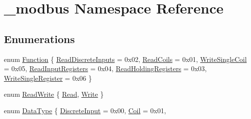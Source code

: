 \hypertarget{namespace__modbus}{}\section{\+\_\+modbus Namespace Reference}
\label{namespace__modbus}
\subsection*{Enumerations}
\begin{DoxyCompactItemize}
\item 
enum \hyperlink{namespace__modbus_a405e676860ce36c153997102aba73d65}{Function} \{ \newline
\hyperlink{namespace__modbus_a405e676860ce36c153997102aba73d65a1c874247bd0604e12687bc9e9b9c9234}{Read\+Discrete\+Inputs} = 0x02, 
\newline
\hyperlink{namespace__modbus_a405e676860ce36c153997102aba73d65a41faa3d82dbd85bf85bbf86c5e4c3bbe}{Read\+Coils} = 0x01, 
\newline
\hyperlink{namespace__modbus_a405e676860ce36c153997102aba73d65abf6b0c548ca227992f07a8b7f75a3ab7}{Write\+Single\+Coil} = 0x05, 
\newline
\hyperlink{namespace__modbus_a405e676860ce36c153997102aba73d65a1905bb7b9656bd79b12b1f4cb0cc0adf}{Read\+Input\+Registers} = 0x04, 
\newline
\hyperlink{namespace__modbus_a405e676860ce36c153997102aba73d65afd5d707ca352d59d4523439024f62759}{Read\+Holding\+Registers} = 0x03, 
\newline
\hyperlink{namespace__modbus_a405e676860ce36c153997102aba73d65a1c0e8de7b6a64dc774e4be8f025f5ef9}{Write\+Single\+Register} = 0x06
 \}
\item 
enum \hyperlink{namespace__modbus_af31b6a334c948fe83fa3f72d3d5f4f61}{Read\+Write} \{ \newline
\hyperlink{namespace__modbus_af31b6a334c948fe83fa3f72d3d5f4f61af1c5e1032d33319b26a1aa0e8ad3ee6d}{Read}, 
\newline
\hyperlink{namespace__modbus_af31b6a334c948fe83fa3f72d3d5f4f61a2d654b4fcb31a6f8fa8d9f532067abfd}{Write}
 \}
\item 
enum \hyperlink{namespace__modbus_a85902c8bc1ff424855dad072259df913}{Data\+Type} \{ \newline
\hyperlink{namespace__modbus_a85902c8bc1ff424855dad072259df913a95c57566a76cdd0f579795484dc3f466}{Discrete\+Input} = 0x00, 
\newline
\hyperlink{namespace__modbus_a85902c8bc1ff424855dad072259df913a69fac2a2235fe408f5156442fd896169}{Coil} = 0x01, 

\end{DoxyCompactItemize}
